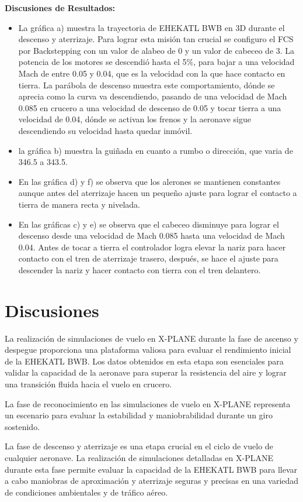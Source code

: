 \textbf{Discusiones de Resultados:}
\begin{itemize}
    \item La gráfica a) muestra la trayectoria de EHEKATL BWB en 3D durante el descenso y aterrizaje. Para lograr esta misión tan crucial se configuro el FCS por Backstepping con un valor de alabeo de 0 y un valor de cabeceo de 3. La potencia de los motores se descendió hasta el 5$\%$, para bajar a una velocidad Mach de entre 0.05 y 0.04, que es la velocidad con la que hace contacto en tierra. La parábola de descenso muestra este comportamiento, dónde se aprecia como la curva va descendiendo, pasando de una velocidad de Mach 0.085 en crucero a una velocidad de descenso de 0.05 y tocar tierra a una velocidad de 0.04, dónde se activan los frenos y la aeronave sigue descendiendo su velocidad hasta quedar inmóvil. 
    \item la gráfica b) muestra la guiñada en cuanto a rumbo o dirección, que varia de 346.5 a 343.5.
    \item En las gráfica d) y f) se observa que los alerones se mantienen constantes aunque antes del aterrizaje hacen un pequeño ajuste para lograr el contacto a tierra de manera recta y nivelada. 
    \item En las gráficas c) y e) se observa que el cabeceo disminuye para lograr el descenso desde una velocidad de Mach 0.085 hasta una velocidad de Mach 0.04. 
    Antes de tocar a tierra el controlador logra elevar la nariz para hacer contacto con el tren de aterrizaje trasero, después, se hace el ajuste para descender la nariz y hacer contacto con tierra con el tren delantero.
\end{itemize}

\section{Discusiones} 

La realización de simulaciones de vuelo en X-PLANE durante la fase de ascenso y despegue proporciona una plataforma valiosa para evaluar el rendimiento inicial de la EHEKATL BWB. Los datos obtenidos en esta etapa son esenciales para validar la capacidad de la aeronave para superar la resistencia del aire y lograr una transición fluida hacia el vuelo en crucero.

La fase de reconocimiento en las simulaciones de vuelo en X-PLANE representa un escenario para evaluar la estabilidad y maniobrabilidad durante un giro sostenido. 

La fase de descenso y aterrizaje es una etapa crucial en el ciclo de vuelo de cualquier aeronave. La realización de simulaciones detalladas en X-PLANE durante esta fase permite evaluar la capacidad de la EHEKATL BWB para llevar a cabo maniobras de aproximación y aterrizaje seguras y precisas en una variedad de condiciones ambientales y de tráfico aéreo.

